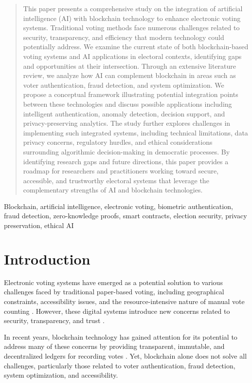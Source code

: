 \documentclass[conference]{IEEEtran}
\begin{document}
\begin{abstract}
This paper presents a comprehensive study on the integration of artificial intelligence (AI) with blockchain technology to enhance electronic voting systems. Traditional voting methods face numerous challenges related to security, transparency, and efficiency that modern technology could potentially address. We examine the current state of both blockchain-based voting systems and AI applications in electoral contexts, identifying gaps and opportunities at their intersection. Through an extensive literature review, we analyze how AI can complement blockchain in areas such as voter authentication, fraud detection, and system optimization. We propose a conceptual framework illustrating potential integration points between these technologies and discuss possible applications including intelligent authentication, anomaly detection, decision support, and privacy-preserving analytics. The study further explores challenges in implementing such integrated systems, including technical limitations, data privacy concerns, regulatory hurdles, and ethical considerations surrounding algorithmic decision-making in democratic processes. By identifying research gaps and future directions, this paper provides a roadmap for researchers and practitioners working toward secure, accessible, and trustworthy electoral systems that leverage the complementary strengths of AI and blockchain technologies.
\end{abstract}

\begin{IEEEkeywords}
Blockchain, artificial intelligence, electronic voting, biometric authentication, fraud detection, zero-knowledge proofs, smart contracts, election security, privacy preservation, ethical AI
\end{IEEEkeywords}

\section{Introduction}
Electronic voting systems have emerged as a potential solution to various challenges faced by traditional paper-based voting, including geographical constraints, accessibility issues, and the resource-intensive nature of manual vote counting \cite{b1}. However, these digital systems introduce new concerns related to security, transparency, and trust \cite{b2}. 

In recent years, blockchain technology has gained attention for its potential to address many of these concerns by providing transparent, immutable, and decentralized ledgers for recording votes \cite{b3}. Yet, blockchain alone does not solve all challenges, particularly those related to voter authentication, fraud detection, system optimization, and accessibility. 
\end{document}
